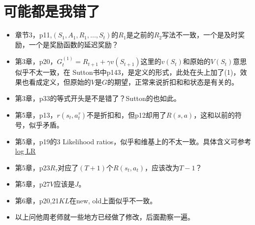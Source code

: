 \documentclass[UTF8]{ctexart}
\begin{document}
\section{可能都是我错了}
\label{sec:seemswrong}
\begin{itemize}
    \item 章节3，p11,$(S_1, A_1, R_1, \ldots, S_t)$的$R_1$是之前的$R_2$写法不一致，一个是及时奖励，一个是奖励函数的延迟奖励？
    \item 第3章，p20，$G_{t}^{(1)}=R_{t+1}+\gamma v(S_{t+1})$这里的$v(S_t)$和原始的$V(S_t)$意思似乎不太一致，在
    Sutton书中p143，是定义的形式，此处在头上加了(1)，效果也看成定义，但原始的$V$是$G$的期望，正常来说折扣和和状态是有关的。
    \item 第3章，p33的等式开头是不是错了？Sutton的也如此。
    \item 第5章，p13，$r(s_t, a_{t}^{\tau})$不是折扣和，但p12却用了$R(s, a)$，这和以前的符号，似乎矛盾。
    \item 第5章，p19的3 Likelihood ratios，似乎和维基上的不太一致。具体含义可参考\href{http://blog.shakirm.com/2015/11/machine-learning-trick-of-the-day-5-log-derivative-trick/}{log LR}
    \item 第5章，p23$R_{\tau}$对应了$(T+1)$个$R(s_t, a_t)$，应该改为$T-1$？
    \item 第5章，p27$V$应该是$J$。
    \item 第6章，p20,21$KL$在new, old上面似乎不一致。
    \item 以上问他周老师就一些地方已经做了修改，后面勘察一遍。
\end{itemize}
\end{document}
